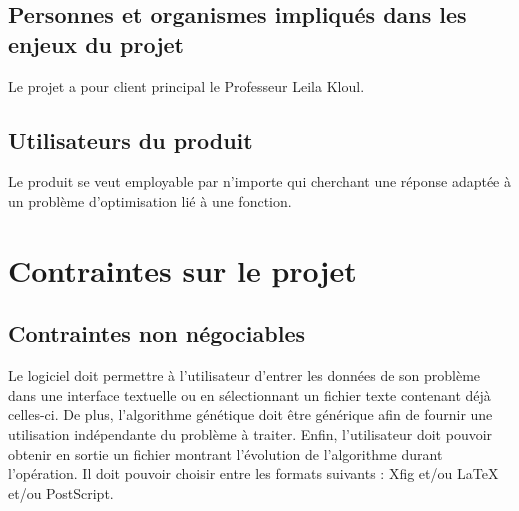 \documentclass[a4paper,11pt]{article}
\begin{document}
		\subsection{Personnes et organismes impliqués dans les enjeux du projet}
			Le projet a pour client principal le Professeur Leila Kloul.
			
		\subsection{ Utilisateurs du produit}
			Le produit se veut employable par n’importe qui cherchant une réponse adaptée à un problème d’optimisation lié à une fonction.
			
	\section{Contraintes sur le projet}
		\subsection{Contraintes non négociables}
			Le logiciel doit permettre à l’utilisateur d’entrer les données de son problème dans une interface textuelle ou en sélectionnant un fichier texte contenant déjà celles-ci.
			De plus, l’algorithme génétique doit être générique afin de fournir une utilisation indépendante du problème à traiter. 
			Enfin, l’utilisateur doit pouvoir obtenir en sortie un fichier montrant l’évolution de l’algorithme durant l’opération.
			Il doit pouvoir choisir entre les formats suivants : Xfig et/ou  LaTeX et/ou PostScript.
		
\end{document}
